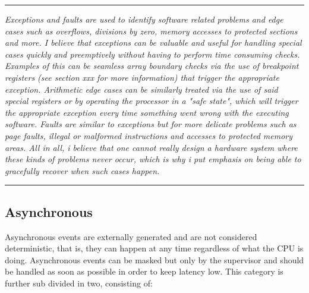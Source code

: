 \documentclass{article}
\begin{document}
        \par\noindent\rule{\textwidth}{0.4pt}
        \textit{Exceptions and faults are used to identify software related problems and edge cases such as overflows, divisions by zero, memory accesses to protected sections and more. I believe that exceptions can be valuable and useful for handling special cases quickly and preemptively without having to perform time consuming checks. Examples of this can be seamless array boundary checks via the use of breakpoint registers (see section xxx for more information) that trigger the appropriate exception. Arithmetic edge cases can be similarly treated via the use of said special registers or by operating the processor in a "safe state", which will trigger the appropriate exception every time something went wrong with the executing software. Faults are similar to exceptions but for more delicate problems such as page faults, illegal or malformed instructions and accesses to protected memory areas. All in all, i believe that one cannot really design a hardware system where these kinds of problems never occur, which is why i put emphasis on being able to gracefully recover when such cases happen.}
        \par\noindent\rule{\textwidth}{0.4pt}

        \subsection{Asynchronous}

            Asynchronous events are externally generated and are not considered deterministic, that is, they can happen at any time regardless of what the CPU is doing. Asynchronous events can be masked but only by the supervisor and should be handled as soon as possible in order to keep latency low. This category is further sub divided in two, consisting of:
\end{document}
